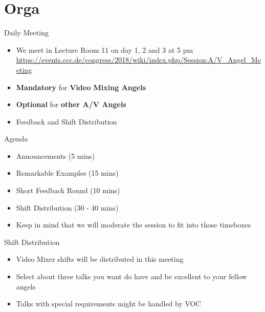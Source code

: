 \documentclass[aspectratio=169]{beamer}
\begin{document}
\section{Orga} 				%
\begin{frame}{Daily Meeting}
\begin{itemize}
	\item We meet in Lecture Room 11 on day 1, 2 and 3 at 5 pm \\
	\renewcommand\UrlFont{\color{blue}\sffamily\textbf}
	\url{https://events.ccc.de/congress/2018/wiki/index.php/Session:A/V_Angel_Meeting}
	\item  \textbf{Mandatory} for \textbf{Video Mixing Angels}
	\item  \textbf{Optional} for \textbf{other A/V Angels}
	\item  Feedback and Shift Distribution
\end{itemize} 
\end{frame}


\begin{frame}{Agenda}		%
\begin{itemize}
	\item Announcements (5 mins)
	\item Remarkable Examples (15 mins)
	\item Short Feedback Round (10 mins)
	\item Shift Distribution (30 - 40 mins)
	\item Keep in mind that we will moderate the session to fit into those timeboxes
\end{itemize} 
\end{frame}

\begin{frame}{Shift Distribution}		%
\begin{itemize}
	\item Video Mixer shifts will be distributed in this meeting
	\item Select about three talks you want do have and be excellent to your fellow angels
	\item Talks with special requirements might be handled by VOC
\end{itemize} 
\end{frame}
\end{document}
